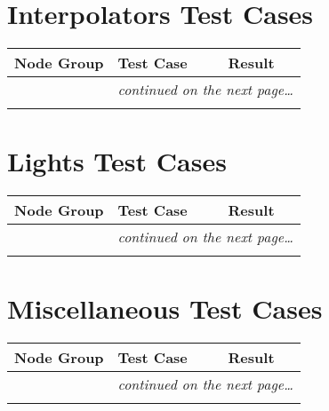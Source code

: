 \documentclass[12pt,letterpaper]{article}
\newcounter{testCaseCtr}
\newcommand{\resetTestCase}{\setcounter{testCaseCtr}{1}}
\begin{document}
\section{Interpolators Test Cases}
\resetTestCase

\begin{center}
\setlongtables
\begin{longtable}{|l|l|l|}
\hline
\textbf{Node Group} & \textbf{Test Case} & \textbf{Result} \\
\hline\hline
\endhead
 & \multicolumn{2}{|r|}{\textsl{continued on the next page\ldots}} \\
\hline
\endfoot
\hline
\endlastfoot
& & \\
\cline{2-3}
\end{longtable}
\end{center}

\section{Lights Test Cases}
\resetTestCase

\begin{center}
\setlongtables
\begin{longtable}{|l|l|l|}
\hline
\textbf{Node Group} & \textbf{Test Case} & \textbf{Result} \\
\hline\hline
\endhead
 & \multicolumn{2}{|r|}{\textsl{continued on the next page\ldots}} \\
\hline
\endfoot
\hline
\endlastfoot
& & \\
\cline{2-3}
\end{longtable}
\end{center}

\section{Miscellaneous Test Cases}
\resetTestCase

\begin{center}
\setlongtables
\begin{longtable}{|l|l|l|}
\hline
\textbf{Node Group} & \textbf{Test Case} & \textbf{Result} \\
\hline\hline
\endhead
 & \multicolumn{2}{|r|}{\textsl{continued on the next page\ldots}} \\
\hline
\endfoot
\hline
\endlastfoot
& & \\
\cline{2-3}
\end{longtable}
\end{center}
\end{document}
